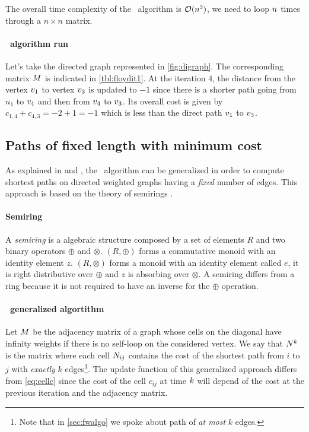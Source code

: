 The overall time complexity of the \FW\ algorithm is $\mathcal{O}(n^3)$, we need to loop $n$ times through a $n \times n$ matrix.





\paragraph{\FW\ algorithm run} Let's take the directed graph represented in \cref{fig:digraph}. The corresponding matrix $M$ is indicated in \cref{tbl:floydit1}. At the iteration $4$, the distance from the vertex $v_1$ to vertex $v_3$ is updated to $-1$ since there is a shorter path going from $n_1$ to $v_4$ and then from $v_4$ to $v_3$. Its overall cost is given by $c_{1,4} + c_{4,3} = -2 + 1 = -1$ which is less than the direct path $v_1$ to $v_3$.

\subsection{Paths of fixed length with minimum cost}

As explained in \cite{floydGeneric} and \cite{cpweb}, the \FW\ algorithm can be generalized in order to compute shortest paths on directed weighted graphs having a \textit{fixed} number of edges. This approach is based on the theory of semirings \cite{ullman}.

\paragraph{Semiring} A \textit{semiring}\cite{semiring} is a algebraic structure composed by a set of elements $R$ and two binary operators $\oplus$ and $\otimes$. $(R, \oplus)$ forms a commutative monoid with an identity element $z$. $(R, \otimes)$ forms a monoid with an identity element called $e$, it is right distributive over $\oplus$ and $z$ is absorbing over $\otimes$. A semiring differs from a ring because it is not required to have an inverse for the $\oplus$ operation.

\paragraph{\FW\ generalized algortithm} Let $M$ be the adjacency matrix of a graph whose cells on the diagonal have infinity weights if there is no self-loop on the considered vertex. We say that $N^k$ is the matrix where each cell $N_{ij}$ contains the cost of the shortest path from $i$ to $j$ with \textit{exactly} $k$ edges\footnote{Note that in \cref{sec:fwalgo} we spoke about path of \textit{at most} $k$ edges.}. The update function of this generalized approach differs from \cref{eq:cellc} since the cost of the cell $c_{ij}$ at time $k$ will depend of the cost at the previous iteration and the adjacency matrix.

